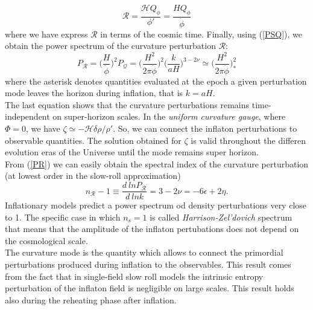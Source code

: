 \documentclass[11pt,a4paper,twoside]{book}
\begin{document}
\begin{equation}
	\label{expressionR}
	\mathcal{R}=\dfrac{\mathcal{H}Q_{\phi}}{\phi'} = \frac{H Q_{\phi}}{\dot{\phi}}
\end{equation}
where we have express $ \mathcal{R} $ in terms of the cosmic time.
Finally, using (\ref{PSQ}), we obtain the power spectrum of the curvature perturbation $\mathcal{R}$:
\begin{equation}
\label{PR}
P_{\mathcal{R}}=\Big (\frac{H}{\dot{\phi}}\Big)^{2}P_{\mathcal{Q}}= \Big (\frac{H^{2}}{2\pi \dot{\phi}}\Big)^{2}\Big(\frac{k}{aH}\Big)^{3-2\nu} \simeq \Big(\frac{H^{2}}{2\pi\dot{\phi}}\Big)^{2}_{*}
\end{equation}
where  the asterisk denotes quantities evaluated at the epoch a given perturbation mode leaves the horizon during inflation, that is $ k=aH $.\\
The last equation shows that the curvature perturbations remains  time-independent on super-horizon scales. In the \textit{uniform curvature gauge}, where $ \Phi=0 $, we have $ \zeta \simeq - \mathcal{H}\delta \rho/\rho' $. So, we can connect the inflaton perturbations to observable quantities.
The solution obtained for $\zeta$ is valid  throughout the differen evolution eras of the Universe until the mode remains super horizon.\\
From (\ref{PR}) we can easily obtain the spectral index of the curvature perturbation (at lowest order in the slow-roll approximation)
\begin{equation}
\label{spectralIndex}
n_{\mathcal{R}}-1\equiv \frac{d\ ln P_{\mathcal{R}}}{d\ ln k} = 3 - 2\nu=-6\epsilon + 2\eta.
\end{equation}
Inflationary models predict a power spectrum od density perturbations very close to 1. The specific case in which $ n_{s}=1 $ is called \textit{Harrison-Zel'dovich} spectrum that means that the amplitude of the inflaton pertubations does not depend on the cosmological scale.\\ 
The curvature mode is the quantity which allows to connect the primordial perturbations produced during inflation to the observables.
This result comes from the fact that in single-field slow roll models the intrinsic entropy perturbation of the inflaton field is negligible on large scales. This result holds also during the reheating phase after inflation\cite{NonGauss:Intro}. 
\end{document}
